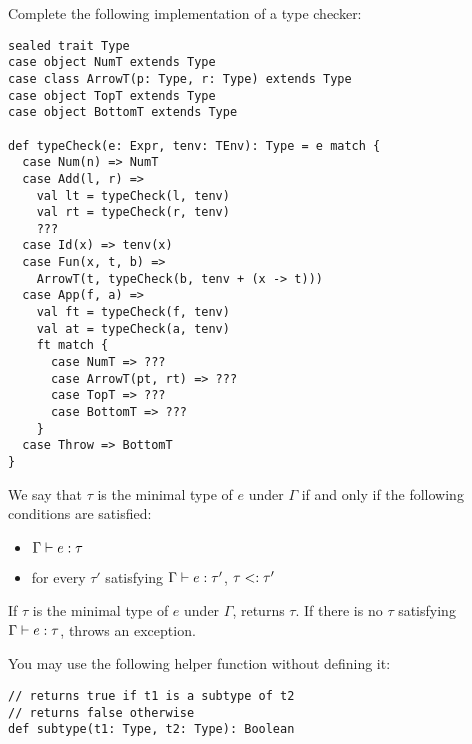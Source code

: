 \begin{exercise}

Complete the following implementation of a \lang type checker:

\begin{verbatim}
sealed trait Type
case object NumT extends Type
case class ArrowT(p: Type, r: Type) extends Type
case object TopT extends Type
case object BottomT extends Type

def typeCheck(e: Expr, tenv: TEnv): Type = e match {
  case Num(n) => NumT
  case Add(l, r) =>
    val lt = typeCheck(l, tenv)
    val rt = typeCheck(r, tenv)
    ???
  case Id(x) => tenv(x)
  case Fun(x, t, b) =>
    ArrowT(t, typeCheck(b, tenv + (x -> t)))
  case App(f, a) =>
    val ft = typeCheck(f, tenv)
    val at = typeCheck(a, tenv)
    ft match {
      case NumT => ???
      case ArrowT(pt, rt) => ???
      case TopT => ???
      case BottomT => ???
    }
  case Throw => BottomT
}
\end{verbatim}

We say that $\tau$ is the minimal type of $e$ under $\Gamma$ if and only if
the following conditions are satisfied:

\begin{itemize}
  \item $\Gamma\vdash e:\tau$
  \item for every $\tau'$ satisfying $\Gamma\vdash e:\tau'$, $\tau<:\tau'$
\end{itemize}

If $\tau$ is the minimal type of $e$ under $\Gamma$,  returns $\tau$. If there is no $\tau$ satisfying $\Gamma\vdash e:\tau$,
 throws an exception.

You may use the following helper function without defining it:

\begin{verbatim}
// returns true if t1 is a subtype of t2
// returns false otherwise
def subtype(t1: Type, t2: Type): Boolean
\end{verbatim}

\end{exercise}

